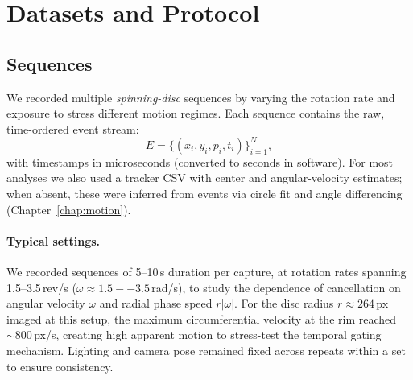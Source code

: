 
\section{Datasets and Protocol}
\label{sec:datasets}

\subsection{Sequences}
We recorded multiple \emph{spinning-disc} sequences by varying the rotation rate and exposure to stress different motion regimes. Each sequence contains the raw, time-ordered event stream:
\[
E = \big\{ (x_i, y_i, p_i, t_i) \big\}_{i=1}^{N},
\]
with timestamps in microseconds (converted to seconds in software). For most analyses we also used a tracker CSV with center and angular-velocity estimates; when absent, these were inferred from events via circle fit and angle differencing (Chapter~\ref{chap:motion}).

\paragraph{Typical settings.}
We recorded sequences of 5--10\,s duration per capture, at rotation rates spanning 1.5--3.5\,rev/s ($\omega \approx 1.5--3.5$\,rad/s), to study the dependence of cancellation on angular velocity $\omega$ and radial phase speed $r|\omega|$. For the disc radius $r \approx 264$\,px imaged at this setup, the maximum circumferential velocity at the rim reached $\sim 800$\,px/s, creating high apparent motion to stress-test the temporal gating mechanism. Lighting and camera pose remained fixed across repeats within a set to ensure consistency.

